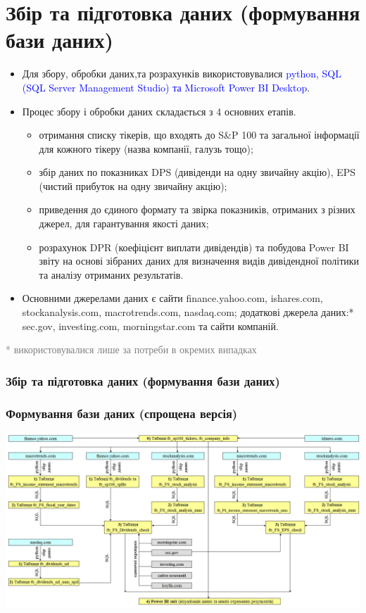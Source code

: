 \documentclass[aspectratio=169]{beamer}
\begin{document}
\section{Збір та підготовка даних (формування бази даних)}
\begin{frame}
\begin{itemize}
\item Для збору, обробки даних,та розрахунків використовувалися \textcolor{blue} {python, SQL (SQL Server Management Studio) та Microsoft Power BI Desktop}.
\bigskip
\item \alert {Процес збору і обробки даних} складається з 4 основних етапів.
\begin{itemize}
    \item[\textcolor{orange}{\textbullet}] отримання списку тікерів, що входять до S\&P 100 та загальної інформації для кожного тікеру (назва компанії, галузь тощо);
    \item[\textcolor{orange}{\textbullet}] збір даних по показниках DPS (дивіденди на одну звичайну акцію), EPS (чистий прибуток на одну звичайну акцію);
    \item[\textcolor{orange}{\textbullet}] приведення до єдиного формату та звірка показників, отриманих з різних джерел, для гарантування якості даних;
    \item[\textcolor{orange}{\textbullet}] розрахунок DPR (коефіцієнт виплати дивідендів) та побудова Power BI звіту на основі зібраних даних для визначення видів дивідендної політики та аналізу отриманих результатів.
\end{itemize}
\bigskip
\item \alert {Основними джерелами даних} є сайти finance.yahoo.com, ishares.com, stockanalysis.com, macrotrends.com, nasdaq.com; додаткові джерела даних:* sec.gov, investing.com, morningstar.com та сайти компаній.
\end{itemize}
\bigskip
\scriptsize \textcolor{gray}{* використовувалися лише за потреби в окремих випадках} 
\frametitle{Збір та підготовка даних (формування бази даних)}

\end{frame}

\begin{frame}
\frametitle{Формування бази даних (спрощена версія)}
\begin{center}
\includegraphics[scale=0.35]{Data Flow full.png}
\end{center}
\end{frame}
\end{document}
